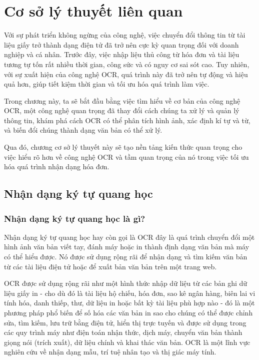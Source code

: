 \chapter{Cơ sở lý thuyết liên quan}
Với sự phát triển không ngừng của công nghệ, việc chuyển đổi thông tin từ tài liệu giấy trở thành dạng điện tử đã trở nên cực kỳ quan trọng đối với doanh nghiệp và cá nhân. Trước đây, việc nhập liệu thủ công từ hóa đơn và tài liệu tương tự tốn rất nhiều thời gian, công sức và có nguy cơ sai sót cao. Tuy nhiên, với sự xuất hiện của công nghệ OCR, quá trình này đã trở nên tự động và hiệu quả hơn, giúp tiết kiệm thời gian và tối ưu hóa quá trình làm việc.

Trong chương này, ta sẽ bắt đầu bằng việc tìm hiểu về cơ bản của công nghệ OCR, một công nghệ quan trọng đã thay đổi cách chúng ta xử lý và quản lý thông tin, khám phá cách OCR có thể phân tích hình ảnh, xác định kí tự và từ, và biến đổi chúng thành dạng văn bản có thể xử lý.

Qua đó, chương cơ sở lý thuyết này sẽ tạo nền tảng kiến thức quan trọng cho việc hiểu rõ hơn về công nghệ OCR và tầm quan trọng của nó trong việc tối ưu hóa quá trình nhận dạng hóa đơn.

\section{Nhận dạng ký tự quang học}
\subsection{Nhận dạng ký tự quang học là gì?}
Nhận dạng ký tự quang học hay còn gọi là OCR đây là quá trình chuyển đổi một hình ảnh văn bản viết tay, đánh máy hoặc in thành định dạng văn bản mà máy có thể hiểu được. Nó được sử dụng rộng rãi để nhận dạng và tìm kiếm văn bản từ các tài liệu điện tử hoặc để xuất bản văn bản trên một trang web. \cite{aws, survey_ocr_Applications}

OCR được sử dụng rộng rãi như một hình thức nhập dữ liệu từ các bản ghi dữ liệu giấy in - cho dù đó là tài liệu hộ chiếu, hóa đơn, sao kê ngân hàng, biên lai vi tính hóa, danh thiếp, thư, dữ liệu in hoặc bất kỳ tài liệu phù hợp nào - đó là một phương pháp phổ biến để số hóa các văn bản in sao cho chúng có thể được chỉnh sửa, tìm kiếm, lưu trữ bằng điện tử, hiển thị trực tuyến và được sử dụng trong các quy trình máy như điện toán nhận thức, dịch máy, chuyển văn bản thành giọng nói (trích xuất), dữ liệu chính và khai thác văn bản. OCR là một lĩnh vực nghiên cứu về nhận dạng mẫu, trí tuệ nhân tạo và thị giác máy tính.\cite{wiki}

